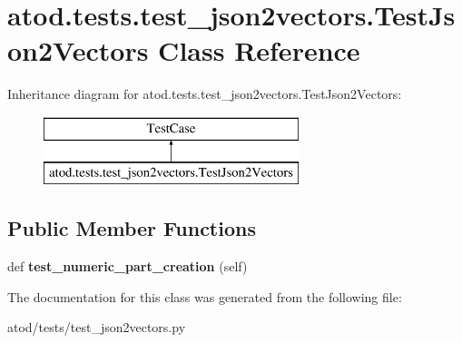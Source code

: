 \hypertarget{classatod_1_1tests_1_1test__json2vectors_1_1_test_json2_vectors}{}\section{atod.\+tests.\+test\+\_\+json2vectors.\+Test\+Json2\+Vectors Class Reference}
\label{classatod_1_1tests_1_1test__json2vectors_1_1_test_json2_vectors}
Inheritance diagram for atod.\+tests.\+test\+\_\+json2vectors.\+Test\+Json2\+Vectors\+:\begin{figure}[H]
\begin{center}
\leavevmode
\includegraphics[height=2.000000cm]{classatod_1_1tests_1_1test__json2vectors_1_1_test_json2_vectors}
\end{center}
\end{figure}
\subsection*{Public Member Functions}
\begin{DoxyCompactItemize}
\item 
def {\bfseries test\+\_\+numeric\+\_\+part\+\_\+creation} (self)\hypertarget{classatod_1_1tests_1_1test__json2vectors_1_1_test_json2_vectors_a8f7a2f5b36f6bce066aeae763b093dc6}{}\label{classatod_1_1tests_1_1test__json2vectors_1_1_test_json2_vectors_a8f7a2f5b36f6bce066aeae763b093dc6}

\end{DoxyCompactItemize}


The documentation for this class was generated from the following file\+:\begin{DoxyCompactItemize}
\item 
atod/tests/test\+\_\+json2vectors.\+py\end{DoxyCompactItemize}
